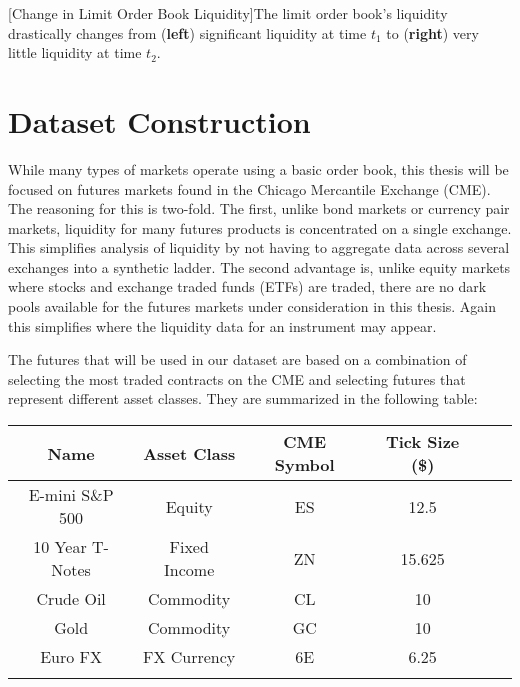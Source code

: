 \begin{center} 
[Change in Limit Order Book Liquidity]{The limit order book's liquidity drastically changes from (\textbf{left}) significant liquidity at time $t_1$ to (\textbf{right}) very little liquidity at time $t_2$.} 
\label{fig:book_img} 
\end{center}



\section{Dataset Construction}

While many types of markets operate using a basic order book, this thesis will be focused on futures markets found in the Chicago Mercantile Exchange (CME). The reasoning for this is two-fold. The first, unlike bond markets or currency pair markets, liquidity for many futures products is concentrated on a single exchange. This simplifies analysis of liquidity by not having to aggregate data across several exchanges into a synthetic ladder. The second advantage is, unlike equity markets where stocks and exchange traded funds (ETFs) are traded, there are no dark pools available for the futures markets under consideration in this thesis. Again this simplifies where the liquidity data for an instrument may appear.

The futures that will be used in our dataset are based on a combination of selecting the most traded contracts on the CME and selecting futures that represent different asset classes. They are summarized in the following table:

\begin{center}
\begin{tabular}{SSSSSS} \toprule
    {Name} & {Asset Class} & {CME Symbol} & {Tick Size (\$)}\\ \midrule
    {E-mini S\&P 500}  & {Equity} & {ES} & 12.5  \\
    {10 Year T-Notes}  & {Fixed Income}  & {ZN} & 15.625   \\
    {Crude Oil}  & {Commodity}  & {CL} & 10    \\
    {Gold} & {Commodity}  & {GC} & 10   \\
    {Euro FX}  & {FX Currency}  & {6E} & 6.25  \\ \bottomrule
\label{futures}
\end{tabular}
\end{center}

